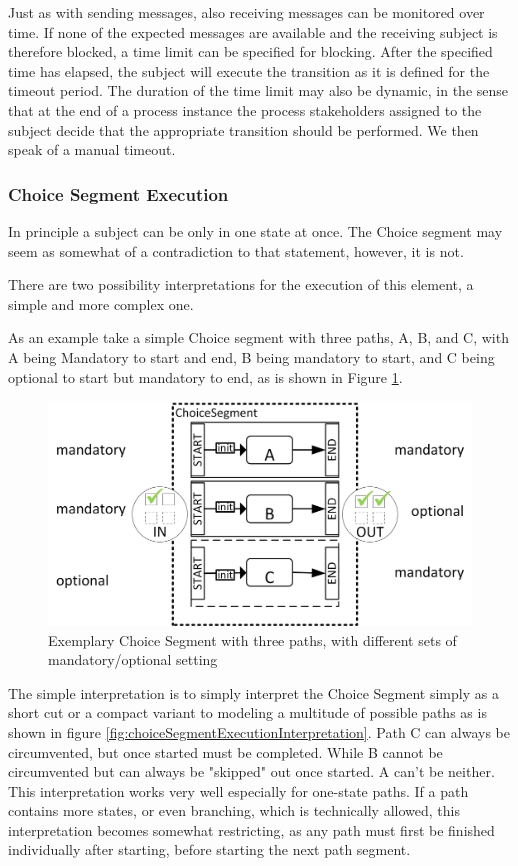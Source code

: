 Just as with sending messages, also receiving messages can be monitored over time. If none of the expected messages are available and the receiving subject is therefore blocked, a time limit can be specified for blocking. After the specified time has elapsed, the subject will execute the transition as it is defined for the timeout period. The duration of the time limit may also be dynamic, in the sense that at the end of a process instance the process stakeholders assigned to the subject decide that the appropriate transition should be performed. We then speak of a manual timeout.



\subsubsection{Choice Segment Execution}
\label{sec:choiceSegmentExecution}

In principle a subject can be only in one state at once. The Choice segment may seem as somewhat of a contradiction to that statement, however, it is not. 

There are two possibility interpretations for the execution of this element, a simple and more complex one. 

As an example take a simple Choice segment with three paths, A, B, and C, with A being Mandatory to start and end, B being mandatory to start, and C being optional to start but mandatory to end, as is shown in Figure \ref{fig:choiceSegmentExecution}. 

\begin{figure}[htbp]
	\centering
	\includegraphics[width=0.7\linewidth]{Figures/Ontology/SubjectBehavior/ChoiceSegment.png}
	\caption[Exemplary Choice Segment with three paths, with different sets of mandatory/optional settings]{Exemplary Choice Segment with three paths, with different sets of mandatory/optional setting}
	\label{fig:choiceSegmentExecution}
\end{figure}

The simple interpretation is to simply interpret the Choice Segment simply as a short cut or a compact variant to modeling a multitude of possible paths as is shown in figure \ref{fig:choiceSegmentExecutionInterpretation}. Path C can always be circumvented, but once started must be completed. While B cannot be circumvented but can always be  "skipped" out once started. A can't be neither. This interpretation works very well especially for one-state paths. If a path contains more states, or even branching, which is technically allowed, this interpretation becomes somewhat restricting, as any path must first be finished individually after starting, before starting the next path segment. 


